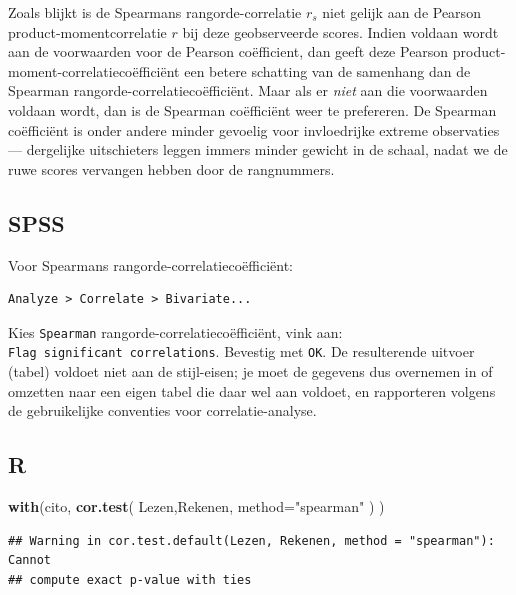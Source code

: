 \documentclass[
]{book}
\newenvironment{Shaded}{\begin{snugshade}}{\end{snugshade}}
\newcommand{\DataTypeTok}[1]{\textcolor[rgb]{0.13,0.29,0.53}{#1}}
\newcommand{\KeywordTok}[1]{\textcolor[rgb]{0.13,0.29,0.53}{\textbf{#1}}}
\newcommand{\NormalTok}[1]{#1}
\newcommand{\StringTok}[1]{\textcolor[rgb]{0.31,0.60,0.02}{#1}}
\begin{document}
Zoals blijkt is de Spearmans rangorde-correlatie \(r_s\) niet gelijk aan
de Pearson product-momentcorrelatie \(r\) bij deze geobserveerde scores.
Indien voldaan wordt aan de voorwaarden voor de Pearson coëfficient, dan
geeft deze Pearson product-moment-correlatiecoëfficiënt een betere
schatting van de samenhang dan de Spearman
rangorde-correlatiecoëfficiënt. Maar als er \emph{niet} aan die voorwaarden
voldaan wordt, dan is de Spearman coëfficiënt weer te prefereren. De
Spearman coëfficiënt is onder andere minder gevoelig voor invloedrijke
extreme observaties --- dergelijke uitschieters leggen immers minder
gewicht in de schaal, nadat we de ruwe scores vervangen hebben door de
rangnummers.

\hypertarget{spss-7}{%
\subsection{SPSS}\label{spss-7}}

Voor Spearmans rangorde-correlatiecoëfficiënt:

\begin{verbatim}
Analyze > Correlate > Bivariate...
\end{verbatim}

Kies \texttt{Spearman} rangorde-correlatiecoëfficiënt, vink aan:
\texttt{Flag\ significant\ correlations}. Bevestig met \texttt{OK}. De resulterende
uitvoer (tabel) voldoet niet aan de stijl-eisen; je moet de gegevens dus
overnemen in of omzetten naar een eigen tabel die daar wel aan voldoet,
en rapporteren volgens de gebruikelijke conventies voor
correlatie-analyse.

\hypertarget{r-8}{%
\subsection{R}\label{r-8}}

\begin{Shaded}
\begin{Highlighting}[]
\KeywordTok{with}\NormalTok{(cito, }\KeywordTok{cor.test}\NormalTok{( Lezen,Rekenen, }\DataTypeTok{method=}\StringTok{"spearman"}\NormalTok{ ) )}
\end{Highlighting}
\end{Shaded}

\begin{verbatim}
## Warning in cor.test.default(Lezen, Rekenen, method = "spearman"): Cannot
## compute exact p-value with ties
\end{verbatim}
\end{document}
